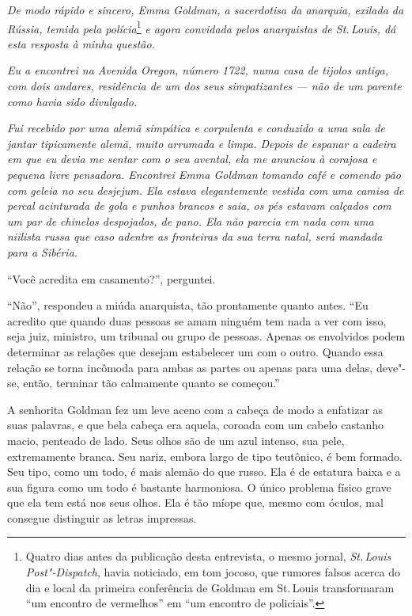 \noindent{}\textit{De modo rápido e sincero, Emma Goldman, a sacerdotisa da anarquia,
exilada da Rússia, temida pela polícia}\footnote{Quatro dias antes da publicação desta entrevista, o mesmo jornal, \textit{St.\,Louis Post"-Dispatch}, havia noticiado, em tom jocoso, que rumores falsos acerca do dia e local da primeira conferência de Goldman em St.\,Louis transformaram ``um encontro de vermelhos'' em ``um encontro de policiais''.} \textit{e agora convidada
pelos anarquistas de St.\,Louis, dá esta resposta à minha questão.}

\textit{Eu a encontrei na Avenida Oregon, número 1722, numa casa
de tijolos antiga, com dois andares, residência de um dos seus
simpatizantes --- não de um parente como havia sido divulgado.}

\textit{Fui recebido por uma alemã simpática e corpulenta e conduzido a uma sala de jantar tipicamente alemã, muito arrumada e limpa. Depois de espanar a
cadeira em que eu devia me sentar com o seu avental, ela me anunciou à
corajosa e pequena livre pensadora. Encontrei Emma Goldman tomando café
e comendo pão com geleia no seu desjejum. Ela estava elegantemente
vestida com uma camisa de percal acinturada de gola e punhos brancos e
saia, os pés estavam calçados com um par de chinelos despojados, de
pano. Ela não parecia em nada com uma niilista russa que caso adentre as
fronteiras da sua terra natal, será mandada para a Sibéria.}

\begin{center}\end{center}

``Você acredita em casamento?'', perguntei.

``Não'', respondeu a miúda anarquista, tão prontamente quanto antes.
``Eu acredito que quando duas pessoas se amam ninguém tem nada a ver com
isso, seja juiz, ministro, um tribunal ou grupo de pessoas.
Apenas os envolvidos podem determinar as relações que desejam estabelecer um com o
outro. Quando essa relação se torna incômoda para ambas as partes ou
apenas para uma delas, deve"-se, então, terminar tão calmamente quanto se
começou.''

A senhorita Goldman fez um leve aceno com a cabeça de modo a enfatizar
as suas palavras, e que bela cabeça era aquela, coroada com um cabelo
castanho macio, penteado de lado. Seus olhos são de um azul intenso,
sua pele, extremamente branca. Seu nariz, embora largo de tipo
teutônico, é bem formado. Seu tipo, como um todo, é mais alemão do que
russo. Ela é de estatura baixa e a sua figura como um todo é bastante harmoniosa.
O único problema físico grave que ela tem está nos seus olhos. Ela é tão míope que,
mesmo com óculos, mal consegue distinguir as letras impressas.

